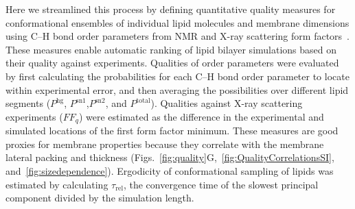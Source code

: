 \documentclass[fleqn,10pt]{wlscirep}
\begin{document}
Here we streamlined this process by defining quantitative quality measures 
for conformational ensembles of individual lipid molecules and membrane dimensions using C--H bond order parameters from NMR and X-ray scattering form factors~\cite{ollila16}. These measures enable automatic ranking of lipid bilayer simulations based on their quality against experiments. Qualities of order parameters were evaluated by first calculating the probabilities for each C--H bond order parameter to locate within experimental error, and then averaging the possibilities over different lipid segments ($P^{\mathrm{hg}}$, $P^{\mathrm{sn1}}$,$P^{\mathrm{sn2}}$, and $P^{\mathrm{total}}$). Qualities against X-ray scattering experiments ($FF_q$) were estimated as the difference in the experimental and simulated locations of the first form factor minimum. These measures are good proxies for membrane properties 
because they correlate with the membrane lateral packing and thickness (Figs.~\ref{fig:quality}G,~\ref{fig:QualityCorrelationsSI}, and~\ref{fig:sizedependence}). Ergodicity of conformational sampling of lipids was estimated by calculating $\tau_\mathrm{rel}$, the convergence time of the slowest principal component divided by the simulation length. 
\end{document}
